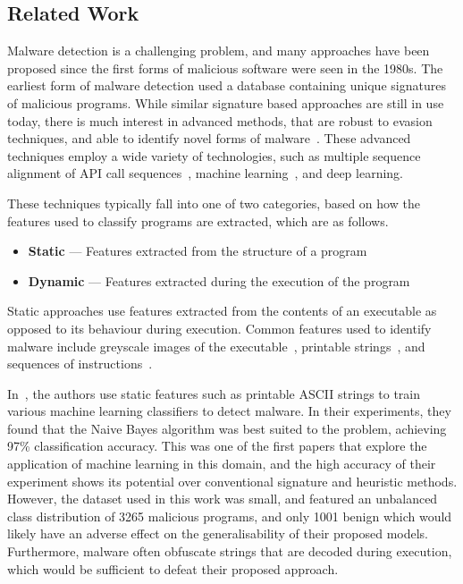 \documentclass[conference,compsoc]{IEEEtran}
\begin{document}
\subsection{Related Work}

Malware detection is a challenging problem, and many approaches have been proposed since the first forms of malicious software were seen in the 1980s. The earliest form of malware detection used a database containing unique signatures of malicious programs. While similar signature based approaches are still in use today, there is much interest in advanced methods, that are robust to evasion techniques, and able to identify novel forms of malware~\cite{m.ComprehensiveSurveyDeep2023,merabetSurveyMalwareDetection2019,aboaojaMalwareDetectionIssues2022,idikamathurSurveyMalwareDetection2007}. These advanced techniques employ a wide variety of technologies, such as multiple sequence alignment of API call sequences~\cite{kiNovelApproachDetect2015}, machine learning~\cite{kambojDetectionMalwareDownloaded2023}, and deep learning.

These techniques typically fall into one of two categories, based on how the features used to classify programs are extracted, which are as follows. 

\begin{itemize}
    \item \textbf{Static} --- Features extracted from the structure of a program
    \item \textbf{Dynamic} --- Features extracted during the execution of the program
\end{itemize}

Static approaches use features extracted from the contents of an executable as opposed to its behaviour during execution. Common features used to identify malware include greyscale images of the executable~\cite{niMalwareIdentificationUsing2018,jainConvolutionalNeuralNetworks2020,habibiPerformanceEvaluationCNN2023}, printable strings~\cite{tianAutomatedClassificationSystem2009,singhDetectionMaliciousSoftware2020,schultzDataMiningMethods2001a}, and sequences of instructions~\cite{kakisimSequentialOpcodeEmbeddingbased2022,wangDeepLearningRegularization2021,daremVisualizationDeeplearningbasedMalware2021}. 

In~\cite{schultzDataMiningMethods2001a}, the authors use static features such as printable ASCII strings to train various machine learning classifiers to detect malware. In their experiments, they found that the Naive Bayes algorithm was best suited to the problem, achieving 97\% classification accuracy. This was one of the first papers that explore the application of machine learning in this domain, and the high accuracy of their experiment shows its potential over conventional signature and heuristic methods. However, the dataset used in this work was small, and featured an unbalanced class distribution of 3265 malicious programs, and only 1001 benign which would likely have an adverse effect on the generalisability of their proposed models. Furthermore, malware often obfuscate strings that are decoded during execution, which would be sufficient to defeat their proposed approach. 
\end{document}
